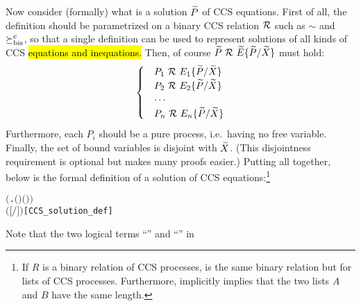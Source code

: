 Now consider (formally) what is a solution $\widetilde P$ of CCS equations. First of
all, the definition should be parametrized on a binary CCS
relation ${\cal R}$ such as $\sim$ and $\mathrel{\succeq^{\rm{c}}_{\rm{bis}}}$, so that a single definition
can be used to represent solutions of all kinds of CCS
\hl{equations and inequations.} Then, of course ${\widetilde P} \ {\cal R}\  {\widetilde E}\{\widetilde
P/\widetilde X\}$ must hold:
\begin{equation*}
  \begin{cases}
    &P_1 \ {\cal R}\ E_1\{\widetilde P/\widetilde X\} \\
    &P_2 \ {\cal R}\ E_2\{\widetilde P/\widetilde X\} \\
    & \cdots \\
    &P_n \ {\cal R}\ E_n\{\widetilde P/\widetilde X\}
  \end{cases}
\end{equation*}
Furthermore, each $P_i$ should be a pure process, i.e.~having no free
variable. Finally, the set of bound variables is disjoint with
$\widetilde X$. (This disjointness requirement is optional but makes many proofs
easier.) Putting all together,
below is the formal definition of a solution of \multivariate CCS
equations:\footnote{If $R$ is a binary relation of CCS processes,
   is the same binary relation but for lists of
  CCS processes. Furthermore,  implicitly
  implies that the two lists $A$ and $B$ have the same length.}
\begin{alltt}
   \HOLTokenTurnstile{}      \HOLSymConst{\HOLTokenEquiv{}}
        \HOLSymConst{\HOLTokenConj{}}  \ensuremath{(}\HOLTokenLambda{}.  \ensuremath{(} \ensuremath{)} \ensuremath{(} \ensuremath{)}\ensuremath{)}  \HOLSymConst{\HOLTokenConj{}}
         \ensuremath{(} \ensuremath{[}\ensuremath{/}\ensuremath{]} \ensuremath{)}\hfill{[CCS_solution_def]}
\end{alltt}
Note that the two logical terms ``'' and ``'' in
